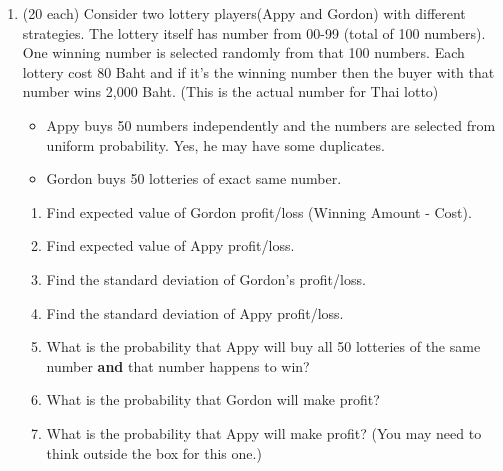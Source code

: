 \documentclass[a4paper, 12pt]{article}
\newcommand{\sanswer}{\vspace{1.25in}}
\newcommand{\manswer}{\vspace{2.5in}}
\begin{document}
\begin{enumerate}
	\newpage
	\item (20 each) Consider two lottery players(Appy and Gordon) with different strategies. The lottery itself has number from 00-99 (total of 100 numbers). One winning number is selected randomly from that 100 numbers. Each lottery cost 80 Baht and if it's the winning number then the buyer with that number wins 2,000 Baht. (This is the actual number for Thai lotto)
	\begin{itemize}
		\item Appy buys 50 numbers independently and the numbers are selected from uniform probability. Yes, he may have some duplicates.
		\item Gordon buys 50 lotteries of exact same number.
	\end{itemize}
	\begin{enumerate}
		\item Find expected value of Gordon profit/loss (Winning Amount - Cost).
		\sanswer
		\item Find expected value of Appy profit/loss.
		\sanswer
		\item Find the standard deviation of Gordon's profit/loss.
		\sanswer
		\item Find the standard deviation of Appy profit/loss.
		\sanswer
		\item What is the probability that Appy will buy all 50 lotteries of the same number \textbf{and} that number happens to win?
		\manswer
		\item What is the probability that Gordon will make profit?
		\sanswer
		\item What is the probability that Appy will make profit? (You may need to think outside the box for this one.)
		\sanswer
	\end{enumerate}


\end{enumerate}
\end{document}
